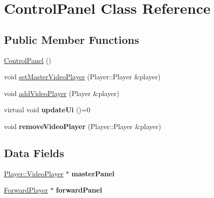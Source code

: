 \hypertarget{classPlayer_1_1ControlPanel}{}\section{Control\+Panel Class Reference}
\label{classPlayer_1_1ControlPanel}
\subsection*{Public Member Functions}
\begin{DoxyCompactItemize}
\item 
\hyperlink{classPlayer_1_1ControlPanel_a0efa607fe77b973e1128eae3bb33a9a1}{Control\+Panel} ()
\item 
void \hyperlink{classPlayer_1_1ControlPanel_a798f5ffd7fe32e3fe8f67feed1e555c4}{set\+Master\+Video\+Player} (Player\+::\+Player \&player)
\item 
void \hyperlink{classPlayer_1_1ControlPanel_a792442cb9717fa224fe8e5bedb06dc89}{add\+Video\+Player} (Player \&player)
\item 
\hypertarget{classPlayer_1_1ControlPanel_aa9963358cf9cff5ea2531d73efa78f73}{}virtual void {\bfseries update\+Ui} ()=0\label{classPlayer_1_1ControlPanel_aa9963358cf9cff5ea2531d73efa78f73}

\item 
\hypertarget{classPlayer_1_1ControlPanel_aa24579c43e90697b0b05662270dfca3f}{}void {\bfseries remove\+Video\+Player} (Player\+::\+Player \&player)\label{classPlayer_1_1ControlPanel_aa24579c43e90697b0b05662270dfca3f}

\end{DoxyCompactItemize}
\subsection*{Data Fields}
\begin{DoxyCompactItemize}
\item 
\hypertarget{classPlayer_1_1ControlPanel_a15c652a3823f382424d5e243a45e8892}{}\hyperlink{classPlayer_1_1VideoPlayer}{Player\+::\+Video\+Player} $\ast$ {\bfseries master\+Panel}\label{classPlayer_1_1ControlPanel_a15c652a3823f382424d5e243a45e8892}

\item 
\hypertarget{classPlayer_1_1ControlPanel_a19d3bc127be800de1935d752240a9fcc}{}\hyperlink{classForwardPlayer}{Forward\+Player} $\ast$ {\bfseries forward\+Panel}\label{classPlayer_1_1ControlPanel_a19d3bc127be800de1935d752240a9fcc}

\end{DoxyCompactItemize}


